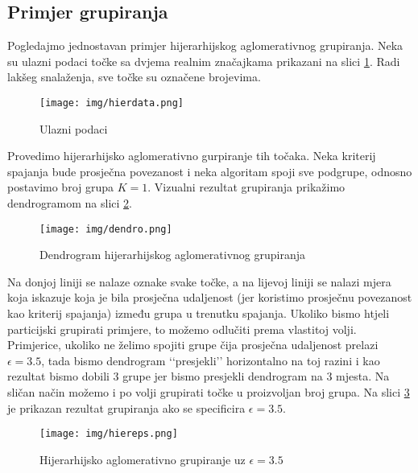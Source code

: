 \documentclass[times, utf8, zavrsni]{fer}
\begin{document}
\subsection{Primjer grupiranja}
Pogledajmo jednostavan primjer hijerarhijskog aglomerativnog grupiranja. Neka su ulazni podaci točke sa dvjema realnim značajkama prikazani na slici \ref{fig:hierdata}. Radi lakšeg snalaženja, sve točke su označene brojevima.
\begin{figure}[H]
    \centering
    \texttt{[image: img/hierdata.png]}
    \caption{Ulazni podaci}
    \label{fig:hierdata}
\end{figure}
Provedimo hijerarhijsko aglomerativno gurpiranje tih točaka. Neka kriterij spajanja bude prosječna povezanost i neka algoritam spoji sve podgrupe, odnosno postavimo broj grupa $K = 1$. Vizualni rezultat grupiranja prikažimo dendrogramom na slici \ref{fig:dendrogram}.
\begin{figure}[H]
    \centering
    \texttt{[image: img/dendro.png]}
    \caption{Dendrogram hijerarhijskog aglomerativnog grupiranja}
    \label{fig:dendrogram}
\end{figure}
Na donjoj liniji se nalaze oznake svake točke, a na lijevoj liniji se nalazi mjera koja iskazuje koja je bila prosječna udaljenost (jer koristimo prosječnu povezanost kao kriterij spajanja) između grupa u trenutku spajanja. Ukoliko bismo htjeli particijski grupirati primjere, to možemo odlučiti prema vlastitoj volji. Primjerice, ukoliko ne želimo spojiti grupe čija prosječna udaljenost prelazi $\epsilon = 3.5$, tada bismo dendrogram ‘‘presjekli’’ horizontalno na toj razini i kao rezultat bismo dobili 3 grupe jer bismo presjekli dendrogram na 3 mjesta. Na sličan način možemo i po volji grupirati točke u proizvoljan broj grupa. Na slici \ref{fig:hiereps} je prikazan rezultat grupiranja ako se specificira $\epsilon = 3.5$.
\begin{figure}[H]
    \centering
    \texttt{[image: img/hiereps.png]}
    \caption{Hijerarhijsko aglomerativno grupiranje uz $\epsilon = 3.5$}
    \label{fig:hiereps}
\end{figure}
\end{document}
